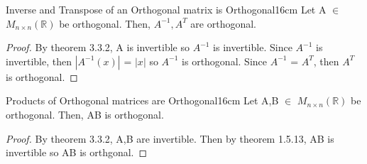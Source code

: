     \newpage



    \begin{corollary}{Inverse and Transpose of an Orthogonal matrix
    is Orthogonal}{16cm}
        Let A $\in$ $M_{n \times n}(\mathbb{R})$ be orthogonal.
        Then, $A^{-1},A^T$ are orthogonal.
    \end{corollary}

    \begin{proof}
        By {\color{red} theorem 3.3.2}, A is invertible so $A^{-1}$ is invertible.
        Since $A^{-1}$ is invertible, then $|A^{-1}(x)|$ = $|x|$
        so $A^{-1}$ is orthogonal.
        Since $A^{-1}$ = $A^T$, then $A^T$ is orthogonal.
    \end{proof}

    \vspace{0.5cm}



    \begin{corollary}{Products of Orthogonal matrices are Orthogonal}{16cm}
        Let A,B $\in$ $M_{n \times n}(\mathbb{R})$ be orthogonal.
        Then, AB is orthogonal.
    \end{corollary}

    \begin{proof}
        By {\color{red} theorem 3.3.2}, A,B are invertible.
        Then by {\color{red} theorem 1.5.13}, AB is invertible
        so AB is orthgonal.
    \end{proof}




